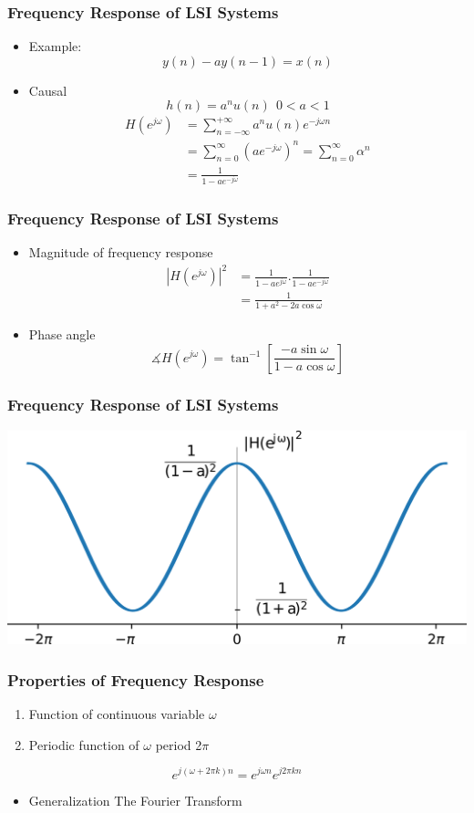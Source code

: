 \documentclass[pdflatex,compress]{beamer}
\begin{document}
\begin{frame}
	\frametitle{Frequency Response of LSI Systems}
	\begin{itemize}
		\item Example:
		\[ y(n) - ay(n-1) = x(n)  \]
		\item Causal
		\[ h(n) = a^n u(n)~~0<a<1 \]
		\begin{align*}
			H(e^{j\omega}) &= \sum_{n = -\infty}^{+\infty}a^n u(n) e^{-j\omega n} \\
			&= \sum_{n = 0}^{\infty} {(ae^{-j\omega})}^n  = \sum_{n = 0}^{\infty} \alpha^n \\
			&= \frac{1}{1 - ae^{-j\omega}}
		\end{align*}
	\end{itemize}
\end{frame}

\begin{frame}
	\frametitle{Frequency Response of LSI Systems}
	\begin{itemize}
		\item Magnitude of frequency response
			\begin{align*}
				{|H(e^{j\omega})|}^2 &= \frac{1}{1 - ae^{j\omega}} . \frac{1}{1 - ae^{-j\omega}} \\
				&= \frac{1}{1 + a^2 - 2a\cos \omega}
			\end{align*}
		\item Phase angle
		\[ \measuredangle H(e^{j\omega}) = \tan^{-1}\left[ \frac{-a\sin \omega}{1 - a\cos \omega} \right] \]
	\end{itemize}
\end{frame}

\begin{frame}
	\frametitle{Frequency Response of LSI Systems}
	\begin{center}
		\includegraphics[width=0.7\linewidth]{img/img02}
	\end{center}
\end{frame}

\begin{frame}
	\frametitle{Properties of Frequency Response}
	\begin{enumerate}
		\item Function of continuous variable $ \omega $
		\item Periodic function of $ \omega $  period 2$\pi$
	\end{enumerate}
	\begin{equation*}
		e^{j(\omega + 2 \pi k)n} = e^{j \omega n} e^{j 2 \pi k n}
	\end{equation*}
	\begin{itemize}
		\item Generalization The Fourier Transform
	\end{itemize}
\end{frame}
\end{document}
